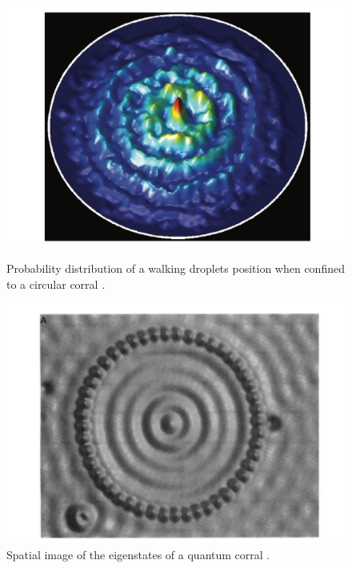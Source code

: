 \documentclass[11pt]{article}
\begin{document}
\begin{figure}[h]
    \centering
    \begin{minipage}{0.45\columnwidth}
        \includegraphics[width=\linewidth]{WalkerCorral.pdf}
        \caption{Probability distribution of a walking droplets position when confined to a circular corral \cite{12}.}
        \label{fig:walkercorral}
    \end{minipage}
    \hspace{1cm}
    \begin {minipage}{0.45\columnwidth}
        \includegraphics[width=\linewidth]{ElectronCorral.pdf}
        \caption{Spatial image of the eigenstates of a quantum corral \cite{21}.}
        \label{fig:electroncorral}
   \end{minipage}
\end{figure}
\end{document}
